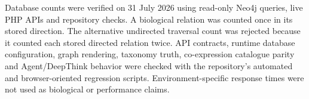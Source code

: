 Database counts were verified on 31 July 2026 using read-only Neo4j queries, live PHP APIs and repository checks. A biological relation was counted once in its stored direction. The alternative undirected traversal count was rejected because it counted each stored directed relation twice. API contracts, runtime database configuration, graph rendering, taxonomy truth, co-expression catalogue parity and Agent/DeepThink behavior were checked with the repository's automated and browser-oriented regression scripts. Environment-specific response times were not used as biological or performance claims.

